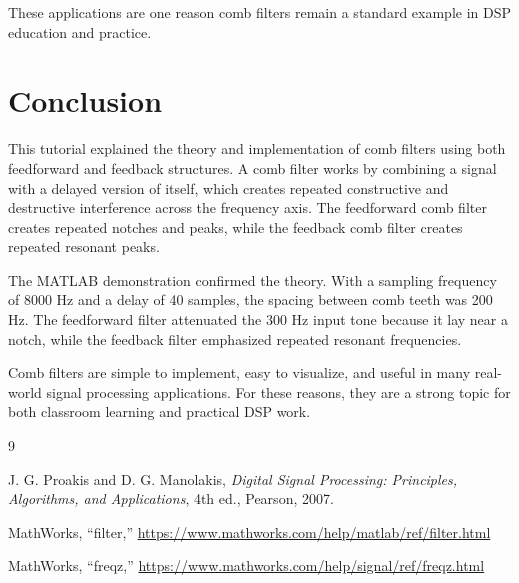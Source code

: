 \documentclass[11pt]{article}
\begin{document}
These applications are one reason comb filters remain a standard example in DSP education and practice.

\section{Conclusion}
This tutorial explained the theory and implementation of comb filters using both feedforward and feedback structures. A comb filter works by combining a signal with a delayed version of itself, which creates repeated constructive and destructive interference across the frequency axis. The feedforward comb filter creates repeated notches and peaks, while the feedback comb filter creates repeated resonant peaks.

The MATLAB demonstration confirmed the theory. With a sampling frequency of 8000 Hz and a delay of 40 samples, the spacing between comb teeth was 200 Hz. The feedforward filter attenuated the 300 Hz input tone because it lay near a notch, while the feedback filter emphasized repeated resonant frequencies.

Comb filters are simple to implement, easy to visualize, and useful in many real-world signal processing applications. For these reasons, they are a strong topic for both classroom learning and practical DSP work.

\begin{thebibliography}{9}

J. G. Proakis and D. G. Manolakis,
\textit{Digital Signal Processing: Principles, Algorithms, and Applications},
4th ed., Pearson, 2007.

MathWorks,
``filter,''
\url{https://www.mathworks.com/help/matlab/ref/filter.html}

MathWorks,
``freqz,''
\url{https://www.mathworks.com/help/signal/ref/freqz.html}

\end{thebibliography}
\end{document}
